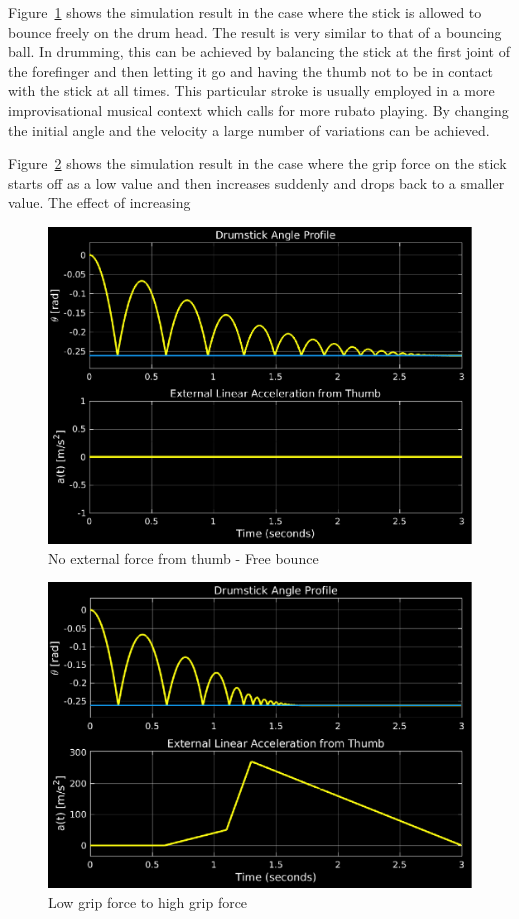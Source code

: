 \documentclass[final,1p,times]{elsarticle}
\begin{document}
Figure~\ref{NF} shows the simulation result in the case where the stick is allowed to bounce freely on the drum head. The result is very similar to that of a bouncing ball. In drumming, this can be achieved by balancing the stick at the first joint of the forefinger and then letting it go and having the thumb not to be in contact with the stick at all times. This particular stroke is usually employed in a more improvisational musical context which calls for more rubato playing. By changing the initial angle and the velocity a large number of variations can be achieved.

Figure~\ref{LH} shows the simulation result in the case where the grip force on the stick starts off as a low value and then increases suddenly and drops back to a smaller value. The effect of increasing
\begin{figure}[H]
	\begin{center}
		\includegraphics[scale =0.65]{./figures/Fig4.eps}
		\caption{No external force from thumb - Free bounce}
		\label{NF}
	\end{center}
\end{figure}
\begin{figure}[H]
	\begin{center}
		\includegraphics[scale =0.67]{./figures/Fig5.eps}
		\caption{Low grip force to high grip force}
		\label{LH}
	\end{center}
\end{figure}
\end{document}

